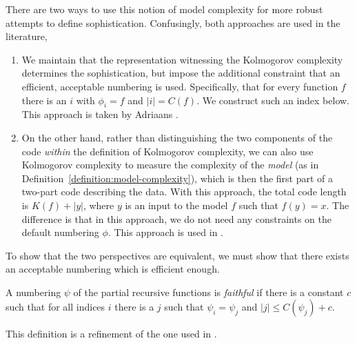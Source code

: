\documentclass{style/llncs}
\begin{document}
There are two ways to use this notion of model complexity for more robust attempts to define sophistication. Confusingly, both approaches are used in the literature,
\begin{enumerate}
  \item We maintain that the representation witnessing the Kolmogorov complexity determines the sophistication, but impose the additional constraint that an efficient, acceptable numbering is used. Specifically, that for every function $f$ there is an $i$ with $\phi_i=f$ and $|i|=C(f)$. We construct such an index below. This approach is taken by Adriaans \cite{adriaans2012facticity}.
  \item On the other hand, rather than distinguishing the two components of the code \emph{within} the definition of Kolmogorov complexity, we can also use Kolmogorov complexity to measure the complexity of the \emph{model} (as in Definition~\ref{definition:model-complexity}), which is then the first part of a two-part code describing the data. With this approach, the total code length is $K(f)+|y|$, where $y$ is an input to the model $f$ such that $f(y)=x$. The difference is that in this approach, we do not need any constraints on the default numbering $\phi$. This approach is used in  \cite{cover1985kolmogorov,gacs2001algorithmic,vitanyi2004meaningful,gellmann1996information}.
\end{enumerate}
To show that the two perspectives are equivalent, we must show that there exists an acceptable numbering which is efficient enough.

\begin{definition}\label{def:faithful}
  A numbering $\psi$ of the partial recursive
  functions is \emph{faithful} if there is a constant $c$ such that
  for all indices $i$ there is a $j$ such that $\psi_i=\psi_j$ and
  $|j|\le C(\psi_j)+c$.
\end{definition}
This definition is a refinement of the one used in \cite{adriaans2012facticity}.\footnotemark
\end{document}
